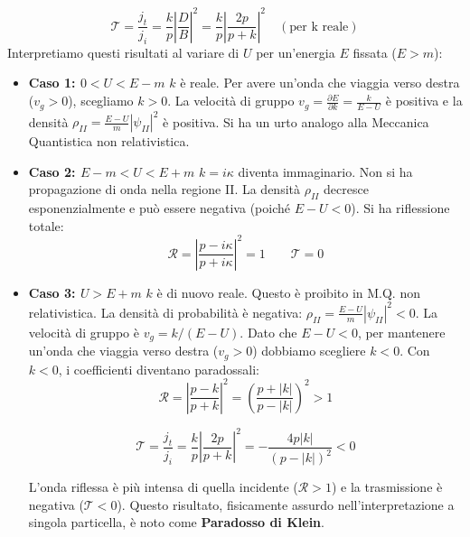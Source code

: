 \begin{equation*}
\mathcal{T}=\frac{j_{t}}{j_{i}}=\frac{k}{p}\left|\frac{D}{B}\right|^{2}=\frac{k}{p}\left|\frac{2p}{p+k}\right|^{2} \quad (\text{per k reale})
\end{equation*}
Interpretiamo questi risultati al variare di $U$ per un'energia $E$ fissata ($E>m$):
\begin{itemize}
    \item \textbf{Caso 1: $0 < U < E-m$}
    $k$ è reale. Per avere un'onda che viaggia verso destra ($v_g > 0$), scegliamo $k>0$. La velocità di gruppo $v_{g}=\frac{\partial E}{\partial k}=\frac{k}{E-U}$ è positiva e la densità $\rho_{II}=\frac{E-U}{m}|\psi_{II}|^{2}$ è positiva. Si ha un urto analogo alla Meccanica Quantistica non relativistica.
    
    \item \textbf{Caso 2: $E-m < U < E+m$}
    $k=i\kappa$ diventa immaginario. Non si ha propagazione di onda nella regione II. La densità $\rho_{II}$ decresce esponenzialmente e può essere negativa (poiché $E-U < 0$). Si ha riflessione totale:
    \begin{equation*}
    \mathcal{R}=\left|\frac{p-i\kappa}{p+i\kappa}\right|^{2}=1 \qquad \mathcal{T}=0
    \end{equation*}
   
    
    \item \textbf{Caso 3: $U > E+m$}
    $k$ è di nuovo reale. Questo è proibito in M.Q. non relativistica.
    La densità di probabilità è negativa: $\rho_{II}=\frac{E-U}{m}|\psi_{II}|^{2} < 0$.
    La velocità di gruppo è $v_{g}=k/(E-U)$. Dato che $E-U < 0$, per mantenere un'onda che viaggia verso destra ($v_g > 0$) dobbiamo scegliere $k < 0$.
    Con $k<0$, i coefficienti diventano paradossali:
    \begin{equation*}
    \mathcal{R}=\left|\frac{p-k}{p+k}\right|^{2}=\left(\frac{p+|k|}{p-|k|}\right)^{2} > 1
    \end{equation*}
   
    \begin{equation*}
    \mathcal{T}=\frac{j_{t}}{j_{i}}=\frac{k}{p}\left|\frac{2p}{p+k}\right|^{2}=-\frac{4p|k|}{(p-|k|)^{2}} < 0
    \end{equation*}
   
    L'onda riflessa è più intensa di quella incidente ($\mathcal{R}>1$) e la trasmissione è negativa ($\mathcal{T}<0$). Questo risultato, fisicamente assurdo nell'interpretazione a singola particella, è noto come \textbf{Paradosso di Klein}.
\end{itemize}

